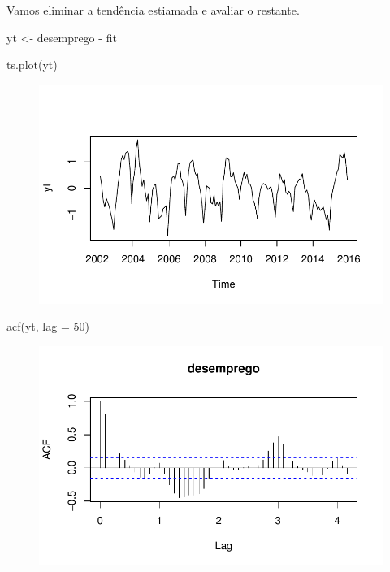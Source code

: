 \documentclass[
  letterpaper,
  DIV=11,
  numbers=noendperiod]{scrreprt}
\newenvironment{Shaded}{\begin{snugshade}}{\end{snugshade}}
\newcommand{\AttributeTok}[1]{\textcolor[rgb]{0.40,0.45,0.13}{#1}}
\newcommand{\DecValTok}[1]{\textcolor[rgb]{0.68,0.00,0.00}{#1}}
\newcommand{\FunctionTok}[1]{\textcolor[rgb]{0.28,0.35,0.67}{#1}}
\newcommand{\NormalTok}[1]{\textcolor[rgb]{0.00,0.23,0.31}{#1}}
\newcommand{\OtherTok}[1]{\textcolor[rgb]{0.00,0.23,0.31}{#1}}
\newcommand{\SpecialCharTok}[1]{\textcolor[rgb]{0.37,0.37,0.37}{#1}}
\begin{document}
Vamos eliminar a tendência estiamada e avaliar o restante.

\begin{Shaded}
\begin{Highlighting}[]
\NormalTok{yt }\OtherTok{\textless{}{-}}\NormalTok{ desemprego }\SpecialCharTok{{-}}\NormalTok{ fit}

\FunctionTok{ts.plot}\NormalTok{(yt)}
\end{Highlighting}
\end{Shaded}

\begin{figure}[H]

{\centering \includegraphics{ferramentas_files/figure-pdf/unnamed-chunk-7-1.pdf}

}

\end{figure}

\begin{Shaded}
\begin{Highlighting}[]
\FunctionTok{acf}\NormalTok{(yt, }\AttributeTok{lag =} \DecValTok{50}\NormalTok{)}
\end{Highlighting}
\end{Shaded}

\begin{figure}[H]

{\centering \includegraphics{ferramentas_files/figure-pdf/unnamed-chunk-7-2.pdf}

}

\end{figure}
\end{document}
